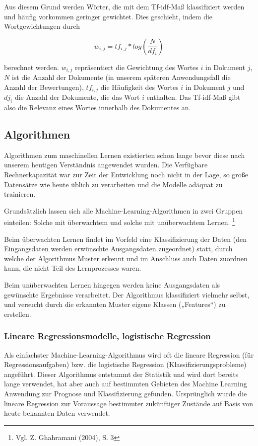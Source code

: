 \documentclass[a4paper,12pt]{article}
\begin{document}
Aus diesem Grund werden Wörter, die mit dem Tf-idf-Maß klassifiziert werden und häufig vorkommen geringer gewichtet. Dies geschieht, indem die Wortgewichtungen durch

\begin{equation}
w_{i,j}=tf_{i,j}*log(\frac{N}{df_i})
\end{equation}

berechnet werden. $w_{i,j}$ repräsentiert die Gewichtung des Wortes $i$ in Dokument $j$, $N$ ist die Anzahl der Dokumente (in unserem späteren Anwendungsfall die Anzahl der Bewertungen), $tf_{i,j}$ die Häufigkeit des Wortes $i$ in Dokument $j$ und $dj_i$ die Anzahl der Dokumente, die das Wort $i$ enthalten. Das Tf-idf-Maß gibt also die Relevanz eines Wortes innerhalb des Dokumentes an. 







\subsection{Algorithmen}
Algorithmen zum maschinellen Lernen existierten schon lange bevor diese nach unserem heutigen Verständnis angewendet wurden. Die Verfügbare Rechnerkapazität war zur Zeit der Entwicklung noch nicht in der Lage, so große Datensätze wie heute üblich zu verarbeiten und die Modelle adäquat zu trainieren. 

Grundsätzlich lassen sich alle Machine-Learning-Algorithmen in zwei Gruppen einteilen: Solche mit überwachtem und solche mit unüberwachtem Lernen. \footnote{Vgl. Z. Ghahramani (2004), S. 3}

Beim überwachten Lernen findet im Vorfeld eine Klassifizierung der Daten (den Eingangsdaten werden erwünschte Ausgangsdaten zugeordnet) statt, durch welche der Algorithmus Muster erkennt und im Anschluss auch Daten zuordnen kann, die nicht Teil des Lernprozesses waren. 

Beim unüberwachten Lernen hingegen werden keine Ausgangsdaten als gewünschte Ergebnisse verarbeitet. Der Algorithmus klassifiziert vielmehr selbst, und versucht durch die erkannten Muster eigene Klassen („Features“) zu erstellen. 



\subsubsection{Lineare Regressionsmodelle, logistische Regression}
Als einfachster Machine-Learning-Algorithmus wird oft die lineare Regression (für Regressionsaufgaben) bzw. die logistische Regression (Klassifizierungsprobleme) angeführt. Dieser Algorithmus entstammt der Statistik und wird dort bereits lange verwendet, hat aber auch auf bestimmten Gebieten des Machine Learning Anwendung zur Prognose und Klassifizierung gefunden. Ursprünglich wurde die lineare Regression zur Voraussage bestimmter zukünftiger Zustände auf Basis von heute bekannten Daten verwendet. 
\end{document}
